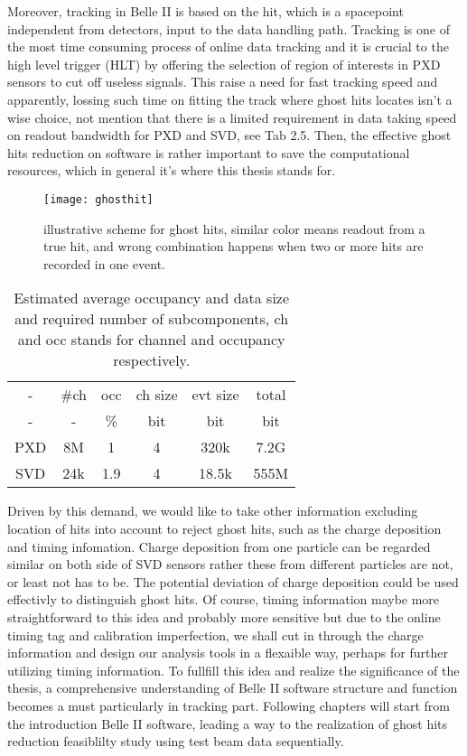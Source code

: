 	Moreover, tracking in Belle II is based on the hit, which is a spacepoint independent from detectors, input to the data handling path. Tracking is one of the most time consuming process of online data tracking and it is crucial to the high level trigger (HLT) by offering the selection of region of interests in PXD sensors to cut off useless signals. This raise a need for fast tracking speed and apparently, lossing such time on fitting the track where ghost hits locates isn't a wise choice, not mention that there is a limited requirement in data taking speed on readout bandwidth for PXD and SVD, see Tab 2.5. Then, the effective ghost hits reduction on software is rather important to save the computational resources, which in general it's where this thesis stands for. 
	
	
\begin{figure}[htbp]
	\centering
	\texttt{[image: ghosthit]}
	\caption{illustrative scheme for ghost hits, similar color means readout from a true hit, and wrong combination happens when two or more hits are recorded in one event.}
\end{figure}

\begin{table}[htbp]
	\large
	\centering
	\begin{tabular}{c|c|c|c|c|c}
		\hline
		- & \#ch & occ & ch size & evt size & total \\
		- & - & \% & bit & bit & bit\\
		\hline
		PXD & 8M & 1 & 4 & 320k & 7.2G \\
		SVD & 24k & 1.9 & 4 & 18.5k & 555M \\
		\hline
	\end{tabular}
	\caption{Estimated average occupancy and data size and required number of subcomponents\cite{abe2010belle}, ch and occ stands for channel and occupancy respectively.}
\end{table}

Driven by this demand, we would like to take other information excluding location of hits into account to reject ghost hits, such as the charge deposition and timing infomation. Charge deposition from one particle can be regarded similar on both side of SVD sensors rather these from different particles are not, or least not has to be. 
The potential deviation of charge deposition could be used effectivly to distinguish ghost hits. Of course, timing information maybe more straightforward to this idea and probably more sensitive but due to the online timing tag and calibration imperfection, we shall cut in through the charge information and design our analysis tools in a flexaible way, perhaps for further utilizing timing information. To fullfill this idea and realize the significance of the thesis, a comprehensive understanding of Belle II software structure and function becomes a must particularly in tracking part. Following chapters will start from the introduction Belle II software, leading a way to the realization of ghost hits reduction feasiblilty study using test beam data sequentially. 




